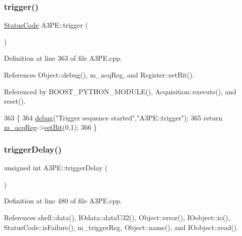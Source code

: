 \subsubsection{\texorpdfstring{trigger()}{trigger()}}
{\footnotesize\ttfamily \hyperlink{classStatusCode}{Status\+Code} A3\+P\+E\+::trigger (\begin{DoxyParamCaption}{ }\end{DoxyParamCaption})}



Definition at line 363 of file A3\+P\+E.\+cpp.



References Object\+::debug(), m\+\_\+acq\+Reg, and Register\+::set\+Bit().



Referenced by B\+O\+O\+S\+T\+\_\+\+P\+Y\+T\+H\+O\+N\+\_\+\+M\+O\+D\+U\+L\+E(), Acquisition\+::execute(), and reset().


\begin{DoxyCode}
363                         \{
364   \hyperlink{classObject_aac010553f022165573714b7014a15f0d}{debug}(\textcolor{stringliteral}{"Trigger sequence started"},\textcolor{stringliteral}{"A3PE::trigger"});
365   \textcolor{keywordflow}{return} \hyperlink{classA3PE_abaf426f4c9192537117b77f9f4821e04}{m\_acqReg}->\hyperlink{classRegister_ab094246dd12aa7e0aa0ca917f4e70b31}{setBit}(0,1);
366 \}
\end{DoxyCode}
\mbox{\label{classA3PE_ac0aabc1457923b7ee7da0a2c91c46451}} 
\subsubsection{\texorpdfstring{trigger\+Delay()}{triggerDelay()}}
{\footnotesize\ttfamily unsigned int A3\+P\+E\+::trigger\+Delay (\begin{DoxyParamCaption}{ }\end{DoxyParamCaption})}



Definition at line 480 of file A3\+P\+E.\+cpp.



References shell\+::data(), I\+Odata\+::data\+U32(), Object\+::error(), I\+Oobject\+::io(), Status\+Code\+::is\+Failure(), m\+\_\+trigger\+Reg, Object\+::name(), and I\+Oobject\+::read().



